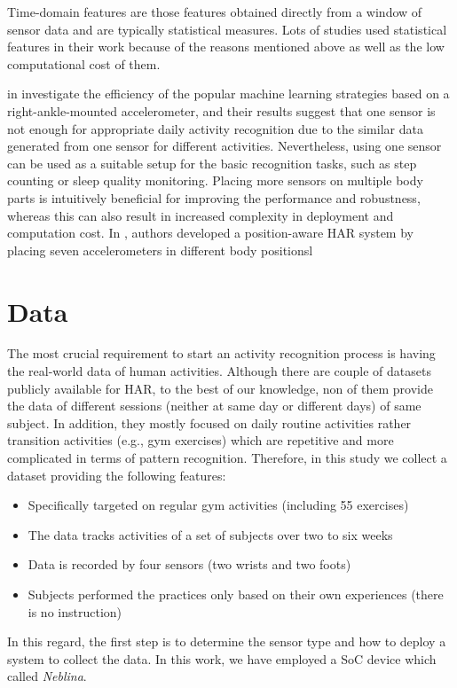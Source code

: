 \documentclass[journal,article,submit,moreauthors,pdftex]{Definitions/mdpi}
\begin{document}
Time-domain features are those features obtained directly from a window of sensor data and are typically statistical measures.  Lots of studies used statistical features in their work because of the reasons mentioned above as well as the low computational cost of them.




in \cite{Suto et al., 2017} investigate the efficiency of the popular machine learning strategies based on a right-ankle-mounted accelerometer, and their results suggest that one sensor is not enough for appropriate daily activity recognition due to the similar data generated from one sensor for different activities. Nevertheless, using one sensor can be used as a suitable setup for the basic recognition tasks, such as step counting or sleep quality monitoring. Placing more sensors on multiple body parts is intuitively beneficial for improving the performance and robustness, whereas this can also result in increased complexity in deployment and computation cost. In \cite{Sztyler et al.}, authors developed a position-aware HAR system by placing seven accelerometers in different body positionsl
\section{Data}

The most crucial requirement to start an activity recognition process is having the real-world data of human activities. Although there are couple of datasets publicly available for HAR\cite{wang2019survey}, to the best of our knowledge, non of them provide the data of different sessions (neither at same day or different days) of same subject. In addition, they mostly focused on daily routine activities rather transition activities (e.g., gym exercises) which are repetitive and more complicated in terms of pattern recognition\cite{wang2019survey}. Therefore, in this study we collect a dataset providing the following features:
\begin{itemize}[leftmargin=*,labelsep=5.8mm]
	\item Specifically targeted on regular gym activities (including 55 exercises)
	\item The data tracks activities of a set of subjects over two to six weeks
	\item Data is recorded by four sensors (two wrists and two foots)
	\item Subjects performed the practices only based on their own experiences (there is no instruction) 
\end{itemize}
In this regard, the first step is to determine the sensor type and how to deploy a system to collect the data. In this work, we have employed a SoC device which called \textit{Neblina}.
\end{document}
